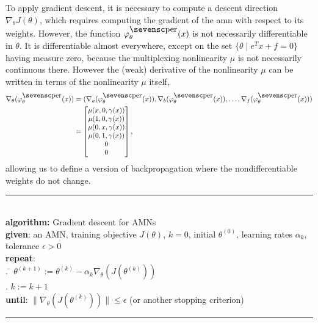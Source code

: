 \documentclass[10pt]{article}
\newcommand{\amn}{\varphi}
\theoremstyle{remark}
\theoremstyle{definition}
\theoremstyle{plain}
\begin{document}
To apply gradient descent, it is necessary to compute a descent direction
$\nabla_\theta J(\theta)$, which requires computing the gradient of the
\acs{amn} with respect to its weights. However, the function 
$\amn^\mathsc{per}_\theta(x)$ is not necessarily differentiable in $\theta$. It
is differentiable almost everywhere, except on the set $\{\theta \mid e^Tx + f
= 0 \}$ having measure zero, because the multiplexing nonlinearity $\mu$ is not
necessarily continuous there.
However the (weak) derivative of the nonlinearity $\mu$ can be written in terms
of the nonlinearity $\mu$ itself,
\begin{align}
	\nabla_\theta (\amn^\mathsc{per}_\theta(x))
	&= (
		\nabla_a (\amn^\mathsc{per}_\theta(x)),
		\nabla_b (\amn^\mathsc{per}_\theta(x)),
		\ldots,
		\nabla_f (\amn^\mathsc{per}_\theta(x))
		)\nonumber \\
	&= \begin{bmatrix}
		\mu(x,0,\gamma(x))\\
		\mu(1,0,\gamma(x))\\
		\mu(0,x,\gamma(x))\\
		\mu(0,1,\gamma(x))\\
		0\\
		0
	\end{bmatrix}, \label{eq:weak_deriv}
\end{align}
allowing us to define a version of backpropagation where the nondifferentiable 
weights do not change.
\begin{tabbing}
    \rule{\linewidth}{0.4pt}\\
    \textbf{algorithm:} Gradient descent for AMNs\\
	\textbf{given}: an AMN, training objective $J(\theta)$, $k=0$, initial
	$\theta^{(0)}$, learning rates $\alpha_k$, \\
	\quad
		\= tolerance $\epsilon > 0$\\
    \textbf{repeat}: \\
        . \= $\theta^{(k+1)} := \theta^{(k)} - \alpha_k \nabla_\theta(J(\theta^{(k)}))$\\
		. \> $k:=k+1$\\
    \textbf{until}: $\|\nabla_\theta(J(\theta^{(k)}))\|\leq \epsilon$
	(or another stopping criterion)\\
    \rule{\linewidth}{0.4pt}
\end{tabbing}
\end{document}
